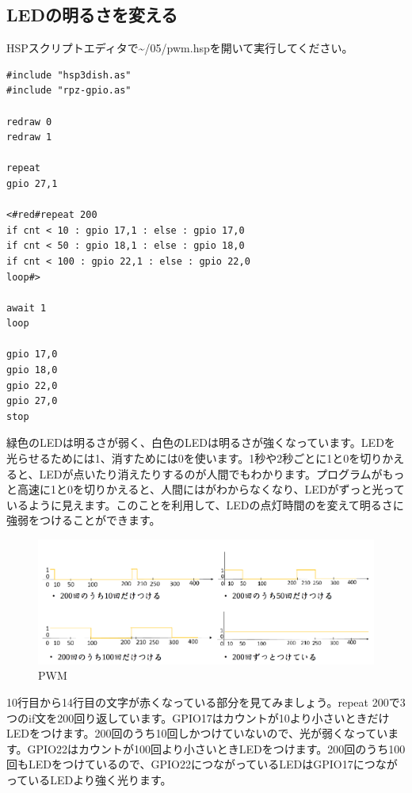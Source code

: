 \subsection{LEDの明るさを変える}
HSPスクリプトエディタで\textasciitilde /05/pwm.hspを開いて実行してください。\\

\begin{lstlisting}[caption=pwm.hsp,label=pwm.hsp]
#include "hsp3dish.as"
#include "rpz-gpio.as"

redraw 0
redraw 1

repeat
gpio 27,1

<#red#repeat 200
if cnt < 10 : gpio 17,1 : else : gpio 17,0
if cnt < 50 : gpio 18,1 : else : gpio 18,0
if cnt < 100 : gpio 22,1 : else : gpio 22,0
loop#>

await 1
loop

gpio 17,0
gpio 18,0
gpio 22,0
gpio 27,0
stop

\end{lstlisting}

緑色のLEDは明るさが弱く、白色のLEDは明るさが強くなっています。LEDを光らせるためには1、消すためには0を使います。1秒や2秒ごとに1と0を切りかえると、LEDが点いたり消えたりするのが人間でもわかります。プログラムがもっと高速に1と0を切りかえると、人間にはがわからなくなり、LEDがずっと光っているように見えます。このことを利用して、LEDの点灯時間のを変えて明るさに強弱をつけることができます。

\begin{figure}[H]
\centering
\includegraphics[scale=0.5]{images/chap05/text05-img035.png}
\caption{PWM}
\end{figure}

10行目から14行目の文字が赤くなっている部分を見てみましょう。repeat 200で3つのif文を200回り返しています。GPIO17はカウントが10より小さいときだけLEDをつけます。200回のうち10回しかつけていないので、光が弱くなっています。GPIO22はカウントが100回より小さいときLEDをつけます。200回のうち100回もLEDをつけているので、GPIO22につながっているLEDはGPIO17につながっているLEDより強く光ります。